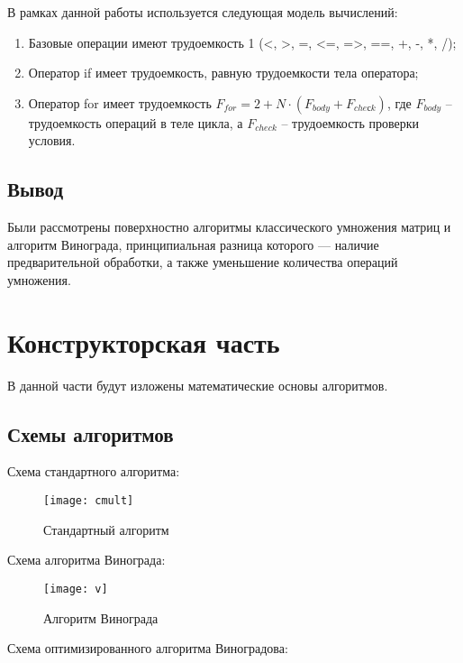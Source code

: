 \documentclass[a4paper, 14pt]{article}
\begin{document}
	В рамках данной работы используется следующая модель вычислений:
	
\begin{enumerate}
  	\item Базовые операции имеют трудоемкость 1 (<, >, =, <=, =>, ==, +, -, *, /);
	\item Оператор if имеет трудоемкость, равную трудоемкости тела оператора;
	\item Оператор for имеет трудоемкость  $F_{for} = 2 + N \cdot (F_{body} + F_{cheсk})$, где $F_{body}$ – трудоемкость операций в теле цикла, а $F_{check}$ – трудоемкость проверки условия.
\end{enumerate}
	
	\subsection{Вывод}
	Были рассмотрены поверхностно алгоритмы классического умножения матриц и алгоритм Винограда, принципиальная разница которого — наличие предварительной обработки, а также уменьшение количества операций умножения.
	
	\newpage
	\section{Конструкторская часть}
	
	В данной части будут изложены математические основы алгоритмов.
	
	\subsection{Схемы алгоритмов}
	
	Схема стандартного алгоритма:
		\begin{figure}[H]
        	\begin{center}
        		{\texttt{[image: cmult]}}
        		\caption{Стандартный алгоритм}
        	\end{center}
        \end{figure}
	
	\newpage
	Схема алгоритма Винограда:
	\begin{figure}[H]
        	\begin{center}
        		{\texttt{[image: v]}}
        		\caption{Алгоритм Винограда}
        	\end{center}
        \end{figure}
	
	\newpage
	Схема оптимизированного алгоритма Виноградова:
			
\end{document}
